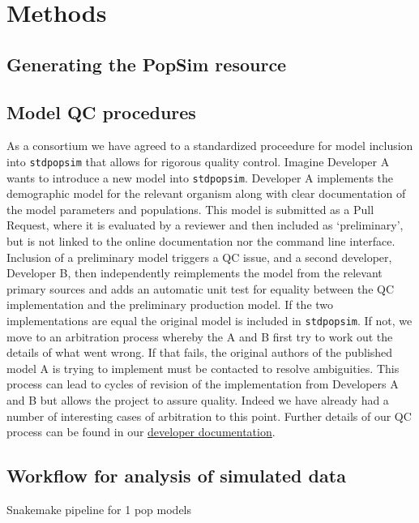 \documentclass[12pt,halfline,a4paper]{ouparticle}
\newcommand{\stdpopsim}{\texttt{stdpopsim}\xspace}
\begin{document}
\section*{Methods}
\subsection*{Generating the PopSim resource}

\subsection*{Model QC procedures}
As a consortium we have agreed to a standardized proceedure for model inclusion
into \stdpopsim that allows for rigorous quality control. Imagine Developer A
wants to introduce a new model into \stdpopsim. Developer A implements the
demographic model for the relevant organism along with clear documentation
of the model parameters and populations. This model is submitted as a Pull Request,
where it is evaluated by a reviewer and then included as `preliminary',
but is not linked to the online documentation nor the command line interface.
Inclusion of a preliminary model triggers a QC issue, and a second developer,
Developer B, then independently reimplements the model from the relevant
primary sources and adds an automatic unit test for equality between the
QC implementation and the preliminary production model. If the two
implementations are equal the original model is included in \stdpopsim.
If not, we move to an arbitration process whereby the A and B first try
to work out the details of what went wrong. If that fails, the original
authors of the published model A is trying to implement must be contacted
to resolve ambiguities. This process can lead to cycles of revision of
the implementation from Developers A and B but allows the project to assure
quality. Indeed we have already had a number of interesting cases of arbitration
to this point. Further details of our QC process can be found in our
\href{https://stdpopsim.readthedocs.io/en/latest/development.html#}{developer documentation}.

\subsection*{Workflow for analysis of simulated data}
Snakemake pipeline for 1 pop models
\end{document}

